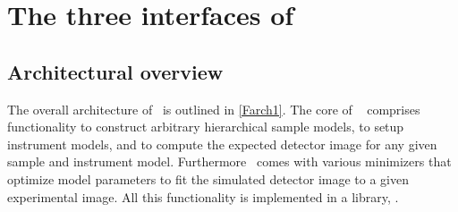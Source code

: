 
\newpage
\chapter{The three interfaces of \BornAgain}  \label{sec:API3}

\section{Architectural overview}

The overall architecture of \BornAgain\ is outlined in \cref{Farch1}.
The core of \BornAgain\
comprises functionality to construct arbitrary hierarchical sample models,
to setup instrument models,
and to compute the expected detector image for any given sample and instrument model.
Furthermore \BornAgain\ comes with various minimizers that optimize model parameters
to fit the simulated detector image to a given experimental image.
All this functionality is implemented in a library, .

